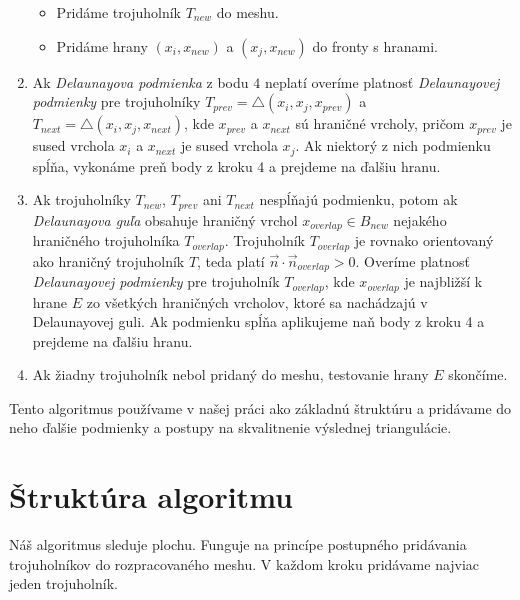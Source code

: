 \begin{enumerate}
{\begin{itemize}
        \item{Pridáme trojuholník $T_{new}$ do meshu.}
        \item{Pridáme hrany $(x_i, x_{new})$ a 
        $(x_j, x_{new})$ do fronty s hranami.}
    \end{itemize}
    }
    \item{
        Ak \textit{Delaunayova podmienka} z bodu $4$ neplatí overíme platnosť \textit{Delaunayovej podmienky} 
        pre trojuholníky 
        $T_{prev} = \bigtriangleup(x_i, x_j, x_{prev})$ a 
        $T_{next} = \bigtriangleup(x_i, x_j, x_{next})$, kde 
        $x_{prev}$ a $x_{next}$ sú hraničné vrcholy,
        pričom $x_{prev}$ 
        je sused vrchola $x_i$ a $x_{next}$ je sused vrchola 
        $x_j$. Ak niektorý z nich podmienku
        spĺňa, vykonáme preň body z kroku 4 a prejdeme na ďalšiu hranu.
    }
    \item{
        Ak trojuholníky $T_{new}$, $T_{prev}$ ani $T_{next}$ nespĺňajú podmienku, potom 
        ak \textit{Delaunayova guľa} obsahuje hraničný vrchol $x_{overlap} \in B_{new}$ nejakého hraničného 
        trojuholníka $T_{overlap}$. Trojuholník $T_{overlap}$ je rovnako orientovaný ako hraničný 
        trojuholník $T$, teda platí $\vec{n} \cdot \vec{n}_{overlap} > 0$. 
        Overíme platnosť \textit{Delaunayovej podmienky} pre 
        trojuholník $T_{overlap}$, kde $x_{overlap}$ je najbližší k hrane $E$ zo všetkých hraničných
        vrcholov, ktoré sa nachádzajú v Delaunayovej guli. Ak podmienku spĺňa aplikujeme naň body z 
        kroku 4 a prejdeme na ďalšiu hranu.
    }
    \item{
        Ak žiadny trojuholník nebol pridaný do meshu, testovanie hrany $E$ skončíme.
    }
\end{enumerate}

Tento algoritmus používame v našej práci ako základnú štruktúru a pridávame do neho ďalšie podmienky 
a postupy na skvalitnenie výslednej triangulácie. 

\section {Štruktúra algoritmu}
\label{kap:first_part_of_algorithm}

Náš algoritmus sleduje plochu.
Funguje na princípe postupného pridávania trojuholníkov do rozpracovaného meshu. V každom kroku
pridávame najviac jeden trojuholník.

